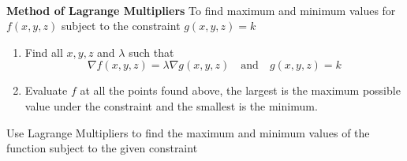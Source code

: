 \documentclass[12pt]{exam}
\begin{document}
\begin{info}
~\\
\textbf{Method of Lagrange Multipliers}
To find maximum and minimum values for \(f(x,y,z)\) subject to the constraint \(g(x,y,z)=k\) 
\begin{enumerate}
    \item Find all \(x,y,z\) and \(\lambda\) such that
    \[
        \nabla f(x,y,z)=\lambda\nabla g(x,y,z) \quad \text{and}\quad g(x,y,z)=k
    \]
    \item Evaluate \(f\) at all the points found above, the largest is the maximum possible value under the constraint and the smallest is the minimum.
    \end{enumerate}

\end{info}

\begin{questions}



\question Use Lagrange Multipliers to find the maximum and minimum values of the function subject to the given constraint 

\end{questions}
\end{document}

